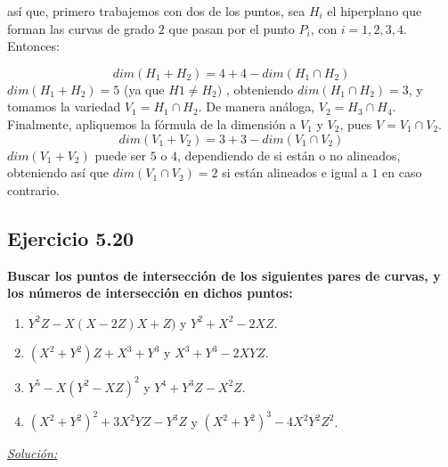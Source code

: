 así que, primero trabajemos con dos de los puntos, sea $H_i$ el hiperplano que forman las curvas de grado $2$ que pasan por el punto $P_i$, con $i=1,2,3,4$. Entonces:

$$dim(H_1+H_2)=4+4-dim(H_1\cap H_2) $$
$dim(H_1+H_2)=5$ (ya que $H1\neq H_2)$ , obteniendo $dim(H_1\cap H_2)=3$, y tomamos la variedad $V_1=H_1\cap H_2$. De manera análoga, $V_2=H_3\cap H_4$. Finalmente, apliquemos la fórmula de la dimensión a $V_1$ y $V_2$, pues $V=V_1\cap V_2$.
$$dim(V_1+V_2)=3+3-dim(V_1\cap V_2)$$
$dim(V_1+V_2)$ puede ser $5$ o $4$, dependiendo de si están o no alineados, obteniendo así que $dim(V_1\cap V_2)=2$ si están alineados e igual a $1$ en caso contrario. 



\subsection{Ejercicio 5.20}
\textbf{Buscar los puntos de intersección de los siguientes pares de curvas, y los números de intersección en dichos puntos:}
\begin{enumerate}
\item $Y^2Z-X(X-2Z)X+Z)$ y $Y^2+X^2-2XZ$.
\item $(X^2+Y^2)Z+X^3+Y^3$ y $X^3+Y^3-2XYZ$.
\item $Y^5-X(Y^2-XZ)^2$ y $Y^4+Y^3Z-X^2Z$.
\item $(X^2+Y^2)^2+3X^2YZ-Y^3Z$ y $(X^2+Y^2)^3-4X^2Y^2Z^2$. 
\end{enumerate}

\underline{\textit{Solución:}}


